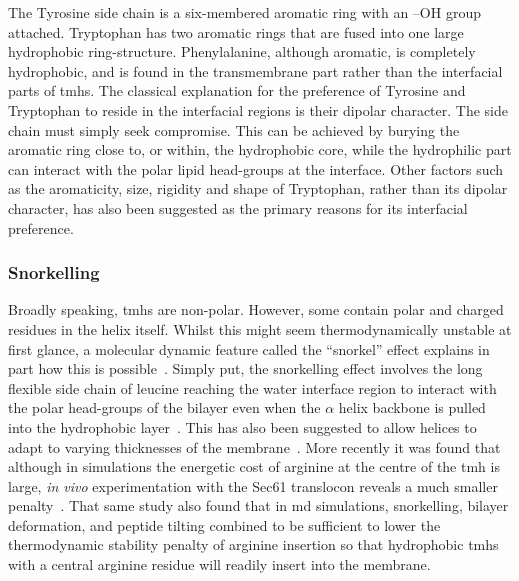 The Tyrosine side chain is a six-membered aromatic ring with an –OH group attached.
Tryptophan has two aromatic rings that are fused into one large hydrophobic ring-structure.
Phenylalanine, although aromatic, is completely hydrophobic, and is found in the transmembrane part rather than the interfacial parts of \gls{tmh}s.
The classical explanation for the preference of Tyrosine and Tryptophan to reside in the interfacial regions is their dipolar character.
The side chain must simply seek compromise.
This can be achieved by burying the aromatic ring close to, or within, the hydrophobic core, while the hydrophilic part can interact with the polar lipid head-groups at the interface.
Other factors such as the aromaticity, size, rigidity and shape of Tryptophan, rather than its dipolar character, has also been suggested as the primary reasons for its interfacial preference.

\subsubsection{Snorkelling}

Broadly speaking, \gls{tmh}s are non-polar.
However, some contain polar and charged residues in the helix itself.
Whilst this might seem thermodynamically unstable at first glance, a molecular dynamic feature called the ``snorkel'' effect explains in part how this is possible~\cite{Chamberlain2004, Strandberg2003}.
Simply put, the snorkelling effect involves the long flexible side chain of leucine reaching the water interface region to interact with the polar head-groups of the bilayer even when the $\alpha$ helix backbone is pulled into the hydrophobic layer~\cite{Krishnakumar2007}.
This has also been suggested to allow helices to adapt to varying thicknesses of the membrane~\cite{Kandasamy2006}.
More recently it was found that although in simulations the energetic cost of arginine at the centre of the \gls{tmh} is large, \textit{in vivo} experimentation with the Sec61 translocon reveals a much smaller penalty~\cite{Ulmschneider2017}.
That same study also found that in \gls{md} simulations, snorkelling, bilayer deformation, and peptide tilting combined to be sufficient to lower the thermodynamic stability penalty of arginine insertion so that hydrophobic \gls{tmh}s with a central arginine residue will readily insert into the membrane.


